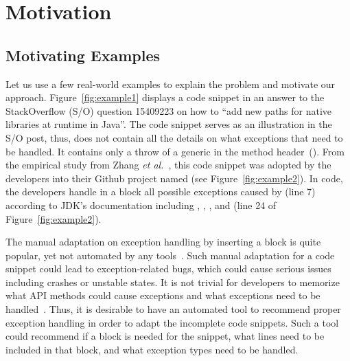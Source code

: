 \section{Motivation}
\label{motiv:sec}

\subsection{Motivating Examples}
\label{examples:sec}



Let us use a few real-world examples to explain the problem and
motivate our approach. Figure~\ref{fig:example1} displays a code
snippet in an answer to the StackOverflow (S/O) question 15409223 on how to
``add new paths for native libraries at runtime in Java''.  The code
snippet serves as an illustration in the S/O post, thus, does
not contain all the details on what exceptions that need to be
handled. It contains only a throw of a generic  in the
method header~(). From the empirical study from
Zhang {\em et al.}~\cite{zhang-icse19}, this code snippet was adopted
by the developers into their Github project named  (see
Figure~\ref{fig:example2}). In  code, the developers
handle in a  block all possible exceptions caused by
 (line 7)
according to JDK's documentation including
, ,
, and
 (line 24 of
Figure~\ref{fig:example2}).

The manual adaptation on exception handling by inserting a
 block is quite popular, yet not automated by any
tools~\cite{zhang-icse19}. Such manual adaptation for a code snippet
could lead to exception-related bugs, which could cause serious issues
including crashes or unstable states. It is not trivial for developers
to memorize what API methods could cause exceptions and what
exceptions need to be handled~\cite{xrank-fse20}. Thus, it is
desirable to have an automated tool to recommend proper exception
handling in order to adapt the incomplete code snippets.  Such a tool
could recommend if a  block is needed for the snippet,
what lines need to be included in that block, and what exception types need
to be handled.


